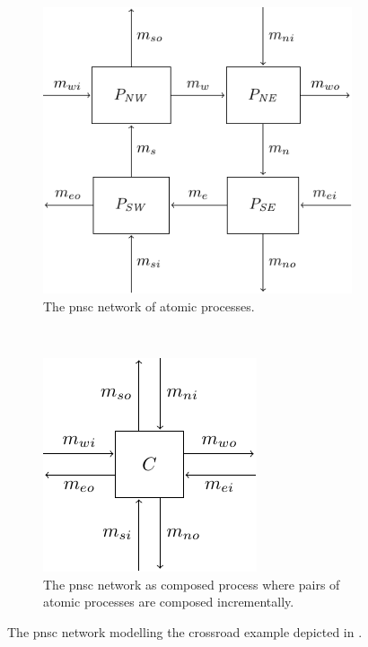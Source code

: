 \begin{figure}[bht]
    \TopFigSpace
    \centering
    \begin{subfigure}[t]{0.56\textwidth}
        \includegraphics[width=\textwidth]{fig/cross_proc_dl.pdf}
        \CaptionFigSpace
        \caption{The \gls{pnsc} network of atomic processes.}
        \label{fig_cross_proc_atomic}
    \end{subfigure}
    ~~
    \begin{subfigure}[t]{0.34\textwidth}
        \includegraphics[width=\textwidth]{fig/cross_proc_composed.pdf}
        \CaptionFigSpace
        \caption{The \gls{pnsc} network as composed process where pairs of atomic processes are composed incrementally.}
        \label{fig_cross_proc_composed}
    \end{subfigure}
    \caption{The \gls{pnsc} network modelling the crossroad example depicted in \Fig{\ref{fig_cross_sync}}.}
    \label{fig_cross_proc_dl}
    \BotFigSpace
\end{figure}
